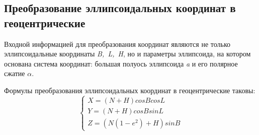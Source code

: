 \documentclass[12pt]{report}
\begin{document}
\subsection*{Преобразование эллипсоидальных координат в геоцентрические}
Входной информацией для преобразования координат являются не только эллипсоидальные координаты \textit{B,~L,~H}, но и параметры эллипсоида, на котором основана система координат: большая полуось эллипсоида \textit{a} и его полярное сжатие \textit{$\alpha$}.
\par
Формулы преобразования эллипсоидальных координат в геоцентрические таковы:
\begin{equation}
\begin{cases}
X = (N + H)cosB cosL
\\
Y = (N+H)cosB sinL
\\
Z = (N(1-e^2)+H)sinB
\end{cases}
\end{equation}
\end{document}
